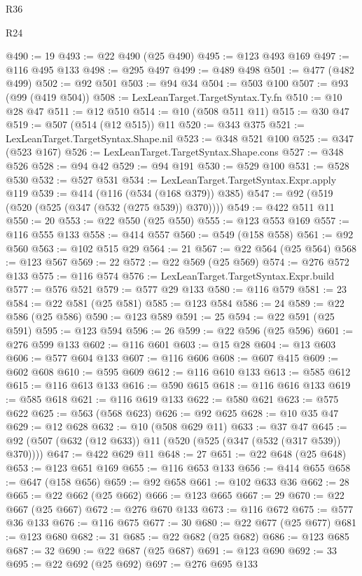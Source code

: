 \begin{lexlean}{R36}
\begin{lexlean}{R24}
\begin{coremodule}
{{{{{{{{{{{{{{{{{{{{{{{{{{{{{{{{{{{{{{{{{{{{{{{{{{{{{{{{{{{{{{{{{{{{{{{{{{{{{{{{{{{{{{{{{{{{{{{{{{{{{{{{{{{{{{{{{{{{{{{{{{{{{{{{{{{{{{{{{{{{{{{{{{{{{{{{{{{{{{{{{{{{{{{{{{{{{{{{{{{{{{{{{{{{{{{{{{{@490 := 19
@493 := @22 @490 (@25 @490)
@495 := @123 @493 @169
@497 := @116 @495 @133
@498 := @295 @497
@499 := @489 @498
@501 := @477 (@482 @499)
@502 := @92 @501
@503 := @94 @34
@504 := @503 @100
@507 := @93 (@99 (@419 @504))
@508 := LexLeanTarget.TargetSyntax.Ty.fn
@510 := @10 @28 @47
@511 := @12 @510
@514 := @10 (@508 @511 @11)
@515 := @30 @47
@519 := @507 (@514 (@12 @515)) @11
@520 := @343 @375
@521 := LexLeanTarget.TargetSyntax.Shape.nil
@523 := @348 @521 @100
@525 := @347 (@523 @167)
@526 := LexLeanTarget.TargetSyntax.Shape.cons
@527 := @348 @526
@528 := @94 @42
@529 := @94 @191
@530 := @529 @100
@531 := @528 @530
@532 := @527 @531
@534 := LexLeanTarget.TargetSyntax.Expr.apply @119
@539 := @414 (@116 (@534 (@168 @379)) @385)
@547 := @92 (@519 (@520 (@525 (@347 (@532 (@275 @539)) @370))))
@549 := @422 @511 @11
@550 := 20
@553 := @22 @550 (@25 @550)
@555 := @123 @553 @169
@557 := @116 @555 @133
@558 := @414 @557
@560 := @549 (@158 @558)
@561 := @92 @560
@563 := @102 @515 @29
@564 := 21
@567 := @22 @564 (@25 @564)
@568 := @123 @567
@569 := 22
@572 := @22 @569 (@25 @569)
@574 := @276 @572 @133
@575 := @116 @574
@576 := LexLeanTarget.TargetSyntax.Expr.build
@577 := @576 @521
@579 := @577 @29 @133
@580 := @116 @579
@581 := 23
@584 := @22 @581 (@25 @581)
@585 := @123 @584
@586 := 24
@589 := @22 @586 (@25 @586)
@590 := @123 @589
@591 := 25
@594 := @22 @591 (@25 @591)
@595 := @123 @594
@596 := 26
@599 := @22 @596 (@25 @596)
@601 := @276 @599 @133
@602 := @116 @601
@603 := @15 @28
@604 := @13 @603
@606 := @577 @604 @133
@607 := @116 @606
@608 := @607 @415
@609 := @602 @608
@610 := @595 @609
@612 := @116 @610 @133
@613 := @585 @612
@615 := @116 @613 @133
@616 := @590 @615
@618 := @116 @616 @133
@619 := @585 @618
@621 := @116 @619 @133
@622 := @580 @621
@623 := @575 @622
@625 := @563 (@568 @623)
@626 := @92 @625
@628 := @10 @35 @47
@629 := @12 @628
@632 := @10 (@508 @629 @11)
@633 := @37 @47
@645 := @92 (@507 (@632 (@12 @633)) @11 (@520 (@525 (@347 (@532 (@317 @539)) @370))))
@647 := @422 @629 @11
@648 := 27
@651 := @22 @648 (@25 @648)
@653 := @123 @651 @169
@655 := @116 @653 @133
@656 := @414 @655
@658 := @647 (@158 @656)
@659 := @92 @658
@661 := @102 @633 @36
@662 := 28
@665 := @22 @662 (@25 @662)
@666 := @123 @665
@667 := 29
@670 := @22 @667 (@25 @667)
@672 := @276 @670 @133
@673 := @116 @672
@675 := @577 @36 @133
@676 := @116 @675
@677 := 30
@680 := @22 @677 (@25 @677)
@681 := @123 @680
@682 := 31
@685 := @22 @682 (@25 @682)
@686 := @123 @685
@687 := 32
@690 := @22 @687 (@25 @687)
@691 := @123 @690
@692 := 33
@695 := @22 @692 (@25 @692)
@697 := @276 @695 @133
}}}}}}}}}}}}}}}}}}}}}}}}}}}}}}}}}}}}}}}}}}}}}}}}}}}}}}}}}}}}}}}}}}}}}}}}}}}}}}}}}}}}}}}}}}}}}}}}}}}}}}}}}}}}}}}}}}}}}}}}}}}}}}}}}}}}}}}}}}}}}}}}}}}}}}}}}}}}}}}}}}}}}}}}}}}}}}}}}}}}}}}}}}}}}}}}}}}
\end{coremodule}
\end{lexlean}
\end{lexlean}
